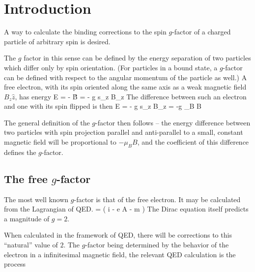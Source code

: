 
\chapter{Introduction}


A way to calculate the binding corrections to the spin $g$-factor of a charged particle of arbitrary spin is desired.


The $g$ factor in this sense can be defined by the energy separation of two particles which differ only by spin orientation.  (For particles in a bound state, a $g$-factor can be defined with respect to the angular momentum of the particle as well.)  A free electron, with its spin oriented along the same axis as a weak magnetic field $B_z\hat{z}$, has energy
\beq
 E = - \gv{\mu} \cdot \v{B} = - g s_z B_z
\eeq
The difference between such an electron and one with its spin flipped is then
\beq
	\delta E = - g s_z B_z = -g \mu_B B
\eeq


The general definition of the $g$-factor then follows -- the energy difference between two particles with spin projection parallel and anti-parallel to a small, constant magnetic field will be proportional to $ - \mu_B B$, and the coefficient of this difference defines the $g$-factor.


\section{The free $g$-factor}
The most well known $g$-factor is that of the free electron.  It may be calculated from the Lagrangian of QED.
\beq
	 = \Psibar \left( i \partial \cdot \gamma - e A \cdot \gamma - m \right ) \Psi
\eeq
The Dirac equation itself predicts a magnitude of $g=2$.  

When calculated in the framework of QED, there will be corrections to this ``natural'' value of $2$.  The $g$-factor being determined by the behavior of the electron in a infinitesimal magnetic field, the relevant QED calculation is the process

